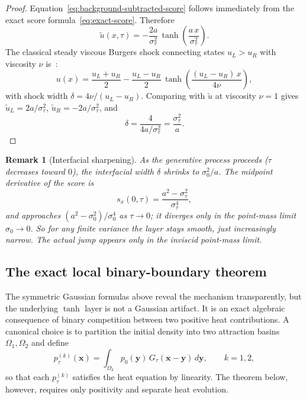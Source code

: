 \documentclass[11pt]{article}
\newtheorem{remark}[theorem]{Remark}
\begin{document}
\begin{proof}
Equation~\eqref{eq:background-subtracted-score} follows immediately from the exact score formula~\eqref{eq:exact-score}. Therefore
\[
  \tilde{u}(x,\tau)
  = -\frac{2a}{\sigma_\tau^2}\,\tanh\!\left(\frac{a\,x}{\sigma_\tau^2}\right).
\]
The classical steady viscous Burgers shock connecting states $u_L > u_R$ with viscosity $\nu$ is~\citep[Ch.~4]{whitham1974linear}:
\begin{equation}\label{eq:classical-shock}
  u(x) = \frac{u_L + u_R}{2} - \frac{u_L - u_R}{2}\,\tanh\!\left(\frac{(u_L - u_R)\,x}{4\nu}\right),
\end{equation}
with shock width $\delta = 4\nu/(u_L - u_R)$.
Comparing with $\tilde{u}$ at viscosity $\nu = 1$ gives $\tilde{u}_L = 2a/\sigma_\tau^2$, $\tilde{u}_R = -2a/\sigma_\tau^2$, and
\[
  \delta = \frac{4}{4a/\sigma_\tau^2} = \frac{\sigma_\tau^2}{a}.
\]
\end{proof}

\begin{remark}[Interfacial sharpening]\label{rem:sharpening}
As the generative process proceeds ($\tau$ decreases toward $0$), the interfacial width $\delta$ shrinks to $\sigma_0^2/a$. The midpoint derivative of the score is
\[
  s_x(0,\tau)=\frac{a^2-\sigma_\tau^2}{\sigma_\tau^4},
\]
and approaches $(a^2-\sigma_0^2)/\sigma_0^4$ as $\tau\to 0$; it diverges only in the point-mass limit $\sigma_0\to 0$. So for any finite variance the layer stays smooth, just increasingly narrow. The actual jump appears only in the inviscid point-mass limit.
\end{remark}

\subsection{The exact local binary-boundary theorem}\label{sec:shocks:local}

The symmetric Gaussian formulas above reveal the mechanism transparently, but the underlying $\tanh$ layer is not a Gaussian artifact.
It is an exact algebraic consequence of binary competition between two positive heat contributions.
A canonical choice is to partition the initial density into two attraction basins $\Omega_1,\Omega_2$ and define
\[
  p_\tau^{(k)}(\bm{x}) = \int_{\Omega_k} p_0(\bm{y})\,G_\tau(\bm{x}-\bm{y})\,d\bm{y},
  \qquad k=1,2,
\]
so that each $p_\tau^{(k)}$ satisfies the heat equation by linearity.
The theorem below, however, requires only positivity and separate heat evolution.
\end{document}
